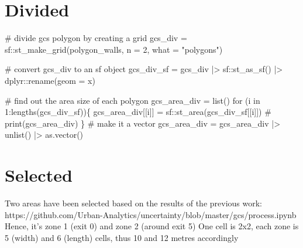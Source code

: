 \documentclass[
  letterpaper,
  DIV=11,
  numbers=noendperiod]{scrreprt}
\newenvironment{Shaded}{\begin{snugshade}}{\end{snugshade}}
\newcommand{\AttributeTok}[1]{\textcolor[rgb]{0.40,0.45,0.13}{#1}}
\newcommand{\CommentTok}[1]{\textcolor[rgb]{0.37,0.37,0.37}{#1}}
\newcommand{\ControlFlowTok}[1]{\textcolor[rgb]{0.00,0.23,0.31}{#1}}
\newcommand{\DecValTok}[1]{\textcolor[rgb]{0.68,0.00,0.00}{#1}}
\newcommand{\FunctionTok}[1]{\textcolor[rgb]{0.28,0.35,0.67}{#1}}
\newcommand{\NormalTok}[1]{\textcolor[rgb]{0.00,0.23,0.31}{#1}}
\newcommand{\OtherTok}[1]{\textcolor[rgb]{0.00,0.23,0.31}{#1}}
\newcommand{\SpecialCharTok}[1]{\textcolor[rgb]{0.37,0.37,0.37}{#1}}
\newcommand{\StringTok}[1]{\textcolor[rgb]{0.13,0.47,0.30}{#1}}
\begin{document}
\hypertarget{divided}{%
\section{Divided}\label{divided}}

\begin{Shaded}
\begin{Highlighting}[]
\CommentTok{\# divide gcs polygon by creating a grid}
\NormalTok{gcs\_div }\OtherTok{=}\NormalTok{ sf}\SpecialCharTok{::}\FunctionTok{st\_make\_grid}\NormalTok{(polygon\_walls, }
                           \AttributeTok{n =} \DecValTok{2}\NormalTok{,}
                           \AttributeTok{what =} \StringTok{"polygons"}\NormalTok{)}

\CommentTok{\# convert gcs\_div to an sf object}
\NormalTok{gcs\_div\_sf }\OtherTok{=}\NormalTok{ gcs\_div }\SpecialCharTok{|\textgreater{}} 
\NormalTok{  sf}\SpecialCharTok{::}\FunctionTok{st\_as\_sf}\NormalTok{() }\SpecialCharTok{|\textgreater{}} 
\NormalTok{  dplyr}\SpecialCharTok{::}\FunctionTok{rename}\NormalTok{(}\AttributeTok{geom =}\NormalTok{ x)}

\CommentTok{\# find out the area size of each polygon}
\NormalTok{gcs\_area\_div }\OtherTok{=} \FunctionTok{list}\NormalTok{()}
\ControlFlowTok{for}\NormalTok{ (i }\ControlFlowTok{in} \DecValTok{1}\SpecialCharTok{:}\FunctionTok{lengths}\NormalTok{(gcs\_div\_sf))\{}
\NormalTok{  gcs\_area\_div[[i]] }\OtherTok{=}\NormalTok{ sf}\SpecialCharTok{::}\FunctionTok{st\_area}\NormalTok{(gcs\_div\_sf[[i]]) }
  \CommentTok{\# print(gcs\_area\_div)}
\NormalTok{\}}
\CommentTok{\# make it a vector}
\NormalTok{gcs\_area\_div }\OtherTok{=}\NormalTok{ gcs\_area\_div }\SpecialCharTok{|\textgreater{}}
  \FunctionTok{unlist}\NormalTok{() }\SpecialCharTok{|\textgreater{}}
  \FunctionTok{as.vector}\NormalTok{()}
\end{Highlighting}
\end{Shaded}

\hypertarget{selected}{%
\section{Selected}\label{selected}}

Two areas have been selected based on the results of the previous work:
https://github.com/Urban-Analytics/uncertainty/blob/master/gcs/process.ipynb
Hence, it's zone 1 (exit 0) and zone 2 (around exit 5) One cell is 2x2,
each zone is 5 (width) and 6 (length) cells, thus 10 and 12 metres
accordingly
\end{document}
